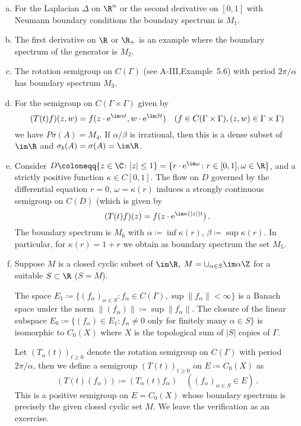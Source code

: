 \begin{examples}\label{ex:b3-2.6}
\begin{enumerate}[(a), wide]
\item
For the Laplacian $\Delta$ on $\R^{n}$ or the second derivative on $[0,1]$ with Neumann boundary conditions the boundary spectrum is $M_{1}$.
	
\item
The first derivative on $\R$ or $\R_{+}$ is an example where the boundary spectrum of the generator is $M_{2}$.
	
\item
The rotation semigroup on $C(\Gamma)$ (see A-III,Example~5.6) with period $2\pi/\alpha$ has boundary spectrum $M_{3}$.
%
%
%			
%			
\item
For the semigroup on $C(\Gamma \times \Gamma)$ given by
	\[
	(T(t)f)(z,w) = f(z\cdot \mathrm{e}^{\im\alpha t},w\cdot \mathrm{e}^{\im\beta  t}) \quad (f \in C(\Gamma \times \Gamma), (z,w) \in \Gamma \times \Gamma)
	\]
	we have $P\sigma(A) = M_{4}$.
	If $\alpha/\beta$ is irrational, then this is a dense subset of $\im \R$ and $\sigma_{b}(A) = \sigma(A) = \im\R$.
	
\item
Consider $D \coloneqq \{z \in \C \colon |z| \leq 1\} = \{r\cdot \mathrm{e}^{\im\omega} \colon r \in [0,1], \omega \in \R\}$, and a strictly positive function $\kappa \in C[0,1]$.
	The flow on $D$ governed by the differential equation $\dot{r} = 0$, $\dot{\omega} = \kappa(r)$ induces a strongly continuous semigroup on $C(D)$ (which is given by
	\[
	(T(t)f)(z) = f(z\cdot \mathrm{e}^{\im\kappa(|z|)t})\,.
	\]
	The boundary spectrum is $M_{6}$ with $\alpha \coloneqq \inf \kappa(r)$, $\beta \coloneqq \sup \kappa(r)$.
	In particular, for $\kappa(r) = 1 + r$ we obtain as boundary spectrum the set $M_{5}$.
	
\item
Suppose $M$ is a closed cyclic subset of $\im \R$, $M = \cup_{\alpha \in S} \im\alpha\Z$ for a suitable $S \subset \R$ (\eg $S = M$).
	
	The space $E_{1} \coloneqq \{(f_{\alpha})_{\alpha \in S} \colon f_{\alpha} \in C(\Gamma), \sup \|f_{\alpha}\| < \infty\}$ is a Banach space under the norm $\|(f_{\alpha})\| \coloneqq \sup \|f_{\alpha}\|$.
	The closure of the linear subspace $E_{0} \coloneqq \{(f_{\alpha}) \in E_{1} \colon f_{\alpha} \neq 0 \text{ only for finitely many } \alpha \in S\}$ is isomorphic to $C_{0}(X)$ where $X$ is the topological sum of $|S|$ copies of $\Gamma$.
	
	Let $(T_{\alpha}(t))_{t \geq 0}$ denote the rotation semigroup on $C(\Gamma)$ with period $2\pi/\alpha$, then we define a semigroup $(T(t))_{t \geq 0}$ on $E \coloneqq C_{0}(X)$ as
	\[
	(T(t)(f_{\alpha})) \coloneqq (T_{\alpha}(t)f_{\alpha}) \quad ((f_{\alpha})_{\alpha \in S} \in E)\,.
	\]
	This is a positive semigroup on $E = C_{0}(X)$ whose boundary spectrum is precisely the given closed cyclic set $M$.
	We leave the verification as an excercise.
	
\end{enumerate}
\end{examples}
